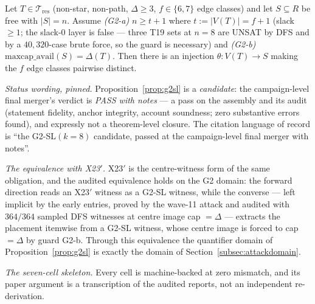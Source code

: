 \begin{proposition}[G2-SL at $k=8$; candidate, not a theorem]\label{prop:g2sl}
Let $T\in\mathcal{T}_{\mathrm{res}}$ (non-star, non-path, $\Delta\ge3$, $f\in\{6,7\}$ edge
classes) and let $S\subseteq R$ be free with $|S|=n$. Assume \emph{(G2-a)} $n\ge t+1$ where
$t:=|V(T)|=f+1$ (slack $\ge1$; the slack-$0$ layer is false --- three T19 sets at $n=8$ are
UNSAT by DFS and by a $40{,}320$-case brute force, so the guard is necessary) and
\emph{(G2-b)} $\mathrm{maxcap\_avail}(S)=\Delta(T)$. Then there is an injection
$\theta:V(T)\to S$ making the $f$ edge classes pairwise distinct.
\end{proposition}

\emph{Status wording, pinned.} Proposition~\ref{prop:g2sl} is a \emph{candidate}: the
campaign-level final merger's verdict is \emph{PASS with notes} --- a pass on the assembly
and its audit (statement fidelity, anchor integrity, account soundness; zero substantive
errors found), and expressly not a theorem-level closure. The citation language of record is
``the G2-SL$(k{=}8)$ candidate, passed at the campaign-level final merger with notes''.

\emph{The equivalence with X23$'$.} X23$'$ is the centre-witness form of the same obligation,
and the audited equivalence holds on the G2 domain: the forward direction reads an X23$'$
witness as a G2-SL witness, while the converse --- left implicit by the early entries,
proved by the wave-11 attack and audited with $364/364$ sampled DFS witnesses at centre
image cap $=\Delta$ --- extracts the placement itemwise from a G2-SL witness, whose centre
image is forced to cap $=\Delta$ by guard G2-b. Through this equivalence the quantifier
domain of Proposition~\ref{prop:g2sl} is exactly the domain of
Section~\ref{subsec:attackdomain}.

\emph{The seven-cell skeleton.} Every cell is machine-backed at zero mismatch, and its paper
argument is a transcription of the audited reports, not an independent re-derivation.


